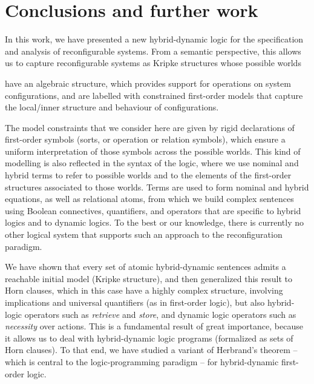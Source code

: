 \documentclass[a4paper,UKenglish,cleveref,autoref]{lipics-v2019}
\begin{document}

\section{Conclusions and further work}
\label{section:conclusions}

In this work, we have presented a new hybrid-dynamic logic for the specification and analysis of reconfigurable systems.
From a semantic perspective, this allows us to capture reconfigurable systems as Kripke structures whose possible worlds%
\begin{inparenum}
  \inparitem have an algebraic structure, which provides support for operations on system configurations, and
  \inparitem are labelled with constrained first-order models that capture the local/inner structure and behaviour of configurations.
\end{inparenum}
The model constraints that we consider here are given by rigid declarations of first-order symbols (sorts, or operation or relation symbols), which ensure a uniform interpretation of those symbols across the possible worlds.
This kind of modelling is also reflected in the syntax of the logic, where we use nominal and hybrid terms to refer to possible worlds and to the elements of the first-order structures associated to those worlds.
Terms are used to form nominal and hybrid equations, as well as relational atoms, from which we build complex sentences using Boolean connectives, quantifiers, and operators that are specific to hybrid logics and to dynamic logics.
To the best or our knowledge, there is currently no other logical system that supports such an approach to the reconfiguration paradigm.

We have shown that every set of atomic hybrid-dynamic sentences admits a reachable initial model (Kripke structure), and then generalized this result to Horn clauses, which in this case have a highly complex structure, involving implications and universal quantifiers (as in first-order logic), but also hybrid-logic operators such as \emph{retrieve} and \emph{store}, and dynamic logic operators such as \emph{necessity} over actions.
This is a fundamental result of great importance, because it allows us to deal with hybrid-dynamic logic programs (formalized as sets of Horn clauses).
To that end, we have studied a variant of Herbrand's theorem -- which is central to the logic-programming paradigm -- for hybrid-dynamic first-order logic.
\end{document}
